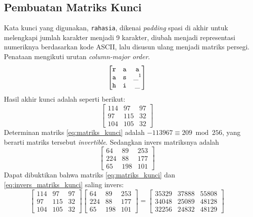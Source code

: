 \subsection{Pembuatan Matriks Kunci}
Kata kunci yang digunakan, \texttt{rahasia}, dikenai \textit{padding} spasi  di akhir
untuk melengkapi jumlah karakter menjadi 9 karakter, diubah menjadi representasi numeriknya 
berdasarkan kode ASCII, lalu disusun ulang menjadi matriks persegi. Penataan mengikuti urutan
\textit{column-major order}. 
\[
\begin{bmatrix}
\texttt{r}&\texttt{a}&\texttt{a}\\
\texttt{a}&\texttt{s}&\_\footnotemark[1]\\
\texttt{h}&\texttt{i}&\_
\end{bmatrix}
\]
Hasil akhir kunci adalah seperti berikut:
\begin{equation}\label{eq:matriks_kunci}
\begin{bmatrix}
114&97 &97\\
97 &115&32\\
104&105&32
\end{bmatrix}
\end{equation}
Determinan matriks \ref{eq:matriks_kunci} adalah $-113967\equiv 209\bmod 256$, yang berarti 
matriks tersebut \textit{invertible}. Sedangkan invers matriksnya adalah
\begin{equation}\label{eq:invers_matriks_kunci}
\begin{bmatrix}
    64&    89&   253\\
   224&    88&   177\\
    65&   198&   101
\end{bmatrix}
\end{equation}
Dapat dibuktikan bahwa matriks \ref{eq:matriks_kunci} dan \ref{eq:invers_matriks_kunci} saling invers:
\begin{equation}
\begin{bmatrix}
	114 & 97  & 97\\
	97  & 115 & 32\\
	104 & 105 & 32
\end{bmatrix}
\begin{bmatrix}
    64&    89&   253\\
   224&    88&   177\\
    65&   198&   101
\end{bmatrix}=
\begin{bmatrix}
   35329&   37888&   55808\\
   34048&   25089&   48128\\
   32256&   24832&   48129
\end{bmatrix}
\end{equation}

